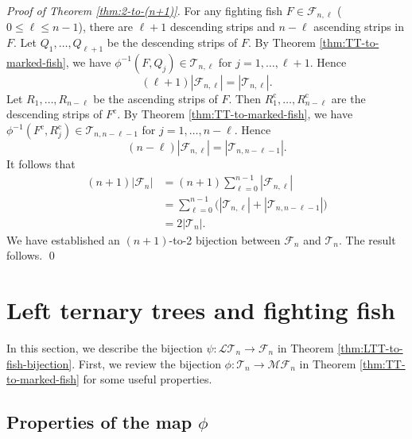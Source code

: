\documentclass[a4paper,11pt,reqno]{amsart}
\theoremstyle{definition}
\numberwithin{equation}{section}
\newcommand{\cc}{{\mathrm{c}}}
\newcommand{\MF}{{\mathcal{MF}}}
\newcommand{\LT}{{\mathcal{LT}}}
\newcommand{\F}{{\mathcal{F}}}
\newcommand{\T}{{\mathcal{T}}}
\begin{document}
\medskip
\noindent
\emph{Proof of Theorem \ref{thm:2-to-(n+1)}.}
For any fighting fish $F\in\F_{n,\ell}$ ($0\le \ell\le n-1$), there are $\ell+1$ descending strips and $n-\ell$ ascending strips in $F$. Let $Q_1,\dots,Q_{\ell+1}$ be the descending strips of $F$. By Theorem \ref{thm:TT-to-marked-fish}, we have $\phi^{-1}(F,Q_j)\in\T_{n,\ell}$ for $j=1,\dots,\ell+1$. Hence
\begin{equation} \label{eqn:Q_is_descending}
(\ell+1)|\F_{n,\ell}| = |\T_{n,\ell}|.
\end{equation}
Let $R_1,\dots,R_{n-\ell}$ be the ascending strips of $F$. Then
$R^{\cc}_1,\dots,R^{\cc}_{n-\ell}$ are the descending strips of $F^{\cc}$.
By Theorem \ref{thm:TT-to-marked-fish},  we have $\phi^{-1}(F^{\cc},R^{\cc}_j)\in\T_{n,n-\ell-1}$ for $j=1,\dots, n-\ell$. Hence
\begin{equation} \label{eqn:Q_is_ascending}
(n-\ell)|\F_{n,\ell}| = |\T_{n,n-\ell-1}|.
\end{equation}
It follows that
\begin{align*}
(n+1)|\F_n| &= (n+1)\sum_{\ell=0}^{n-1} |\F_{n,\ell}| \\
            &= \sum_{\ell=0}^{n-1} \big(|\T_{n,\ell}|+|\T_{n,n-\ell-1}|\big) \\
           &= 2|\T_n|.
\end{align*}
We have established an $(n+1)$-to-2 bijection between $\F_n$ and $\T_n$. The result follows.
\qed







\section{Left ternary trees and fighting fish} \label{sec:left-ternary}

In this section, we describe the bijection $\psi:\LT_n\rightarrow\F_n$ in Theorem \ref{thm:LTT-to-fish-bijection}. First, we review the bijection $\phi:\T_n\rightarrow\MF_n$ in Theorem \ref{thm:TT-to-marked-fish} for some useful properties.

\subsection{Properties of the map $\phi$}
\end{document}
